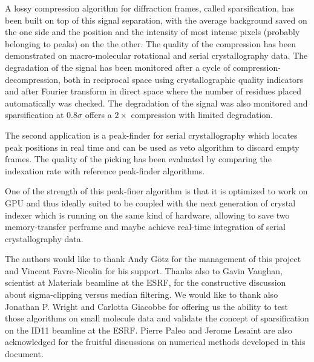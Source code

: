 \documentclass[preprint]{iucr}              %
\begin{document}
A lossy compression algorithm for diffraction frames, called sparsification, has been built on top of this signal separation, with the average background saved on the one side and the position and the intensity of most intense pixels (probably belonging to peaks) on the the other.
The quality of the compression has been demonstrated on macro-molecular rotational and serial crystallography data. 
The degradation of the signal has been monitored after a cycle of compression-decompression, both in reciprocal space using crystallographic quality indicators and after Fourier transform in direct space where the number of residues placed automatically was checked.
The degradation of the signal was also monitored and sparsification at $0.8\sigma$ offers a $2\times$
compression with limited degradation.

The second application is a peak-finder for serial crystallography which locates peak positions in real time and can be used as veto algorithm to discard empty frames. 
The quality of the picking has been evaluated by comparing the indexation rate with reference peak-finder algorithms.

One of the strength of this peak-finer algorithm is that it is optimized to work on GPU and thus ideally suited to be coupled with the next generation of crystal indexer \cite{toro} which is running on the same kind of hardware, allowing to save two memory-transfer perframe and maybe achieve real-time integration of serial crystallography data.



The authors would like to thank Andy G\"otz for the management of this project and Vincent Favre-Nicolin for his support.
Thanks also to Gavin Vaughan, scientist at Materials beamline at the ESRF,  for the constructive discussion about sigma-clipping versus median filtering.
We would like to thank also Jonathan P. Wright and Carlotta Giacobbe for offering us the ability to test those algorithms on small molecule data and validate the concept of sparsification on the ID11 beamline at the ESRF.
Pierre Paleo and Jerome Lesaint are also acknowledged for the fruitful discussions on numerical methods developed in this document.



\end{document}
